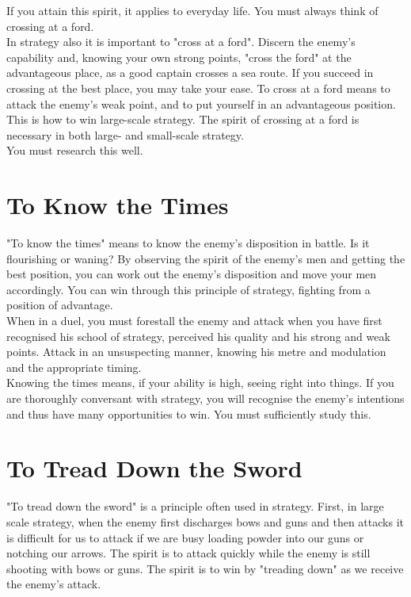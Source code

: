 If you attain this spirit, it applies to everyday life. You must always think of crossing at a ford.\\

In strategy also it is important to "cross at a ford". Discern the enemy's capability and, knowing your own strong points, "cross the ford" at the advantageous place, as a good captain crosses a sea route. If you succeed in crossing at the best place, you may take your ease. To cross at a ford means to attack the enemy's weak point, and to put yourself in an advantageous position. This is how to win large-scale strategy. The spirit of crossing at a ford is necessary in both large- and small-scale strategy.\\

You must research this well.\\
\section{To Know the Times}

"To know the times" means to know the enemy's disposition in battle. Is it flourishing or waning? By observing the spirit of the enemy's men and getting the best position, you can work out the enemy's disposition and move your men accordingly. You can win through this principle of strategy, fighting from a position of advantage.\\

When in a duel, you must forestall the enemy and attack when you have first recognised his school of strategy, perceived his quality and his strong and weak points. Attack in an unsuspecting manner, knowing his metre and modulation and the appropriate timing.\\

Knowing the times means, if your ability is high, seeing right into things. If you are thoroughly conversant with strategy, you will recognise the enemy's intentions and thus have many opportunities to win. You must sufficiently study this.\\
\section{To Tread Down the Sword}

"To tread down the sword" is a principle often used in strategy. First, in large scale strategy, when the enemy first discharges bows and guns and then attacks it is difficult for us to attack if we are busy loading powder into our guns or notching our arrows. The spirit is to attack quickly while the enemy is still shooting with bows or guns. The spirit is to win by "treading down" as we receive the enemy's attack.\\


